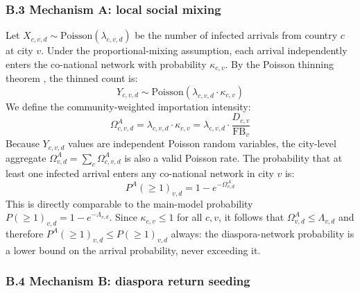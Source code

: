 \documentclass[12pt, a4paper]{article}
\begin{document}
\subsubsection*{B.3 Mechanism A: local social mixing}

Let $X_{c,v,d} \sim \text{Poisson}(\lambda_{c,v,d})$ be the number
of infected arrivals from country $c$ at city $v$. Under the
proportional-mixing assumption, each arrival independently enters
the co-national network with probability $\kappa_{c,v}$. By the
Poisson thinning theorem \citep{Ross2010}, the thinned count is:
\[
  Y_{c,v,d} \sim \text{Poisson}(\lambda_{c,v,d} \cdot \kappa_{c,v})
\]
We define the community-weighted importation intensity:
\[
  \Omega^A_{c,v,d} = \lambda_{c,v,d} \cdot \kappa_{c,v}
    = \lambda_{c,v,d} \cdot \frac{D_{c,v}}{\mathrm{FB}_{v}}
\]
Because $Y_{c,v,d}$ values are independent Poisson random variables,
the city-level aggregate $\Omega^A_{v,d} = \sum_c \Omega^A_{c,v,d}$
is also a valid Poisson rate. The probability that at least one
infected arrival enters any co-national network in city $v$ is:
\[
  P^A(\geq 1)_{v,d} = 1 - e^{-\Omega^A_{v,d}}
\]
This is directly comparable to the main-model probability
$P(\geq 1)_{v,d} = 1 - e^{-\Lambda_{v,d}}$. Since
$\kappa_{c,v} \leq 1$ for all $c,v$, it follows that
$\Omega^A_{v,d} \leq \Lambda_{v,d}$ and therefore
$P^A(\geq 1)_{v,d} \leq P(\geq 1)_{v,d}$ always: the
diaspora-network probability is a lower bound on the arrival
probability, never exceeding it.

\subsubsection*{B.4 Mechanism B: diaspora return seeding}
\end{document}
